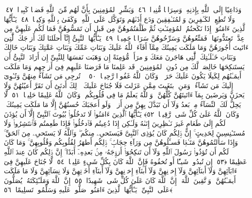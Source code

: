  وَدَاعِيًا إِلَى ٱللَّهِ بِإِذنِهِۦ وَسِرَاجًۭا مُّنِيرًۭا ﴿٤٦﴾
 وَبَشِّرِ ٱلمُؤمِنِينَ بِأَنَّ لَهُم مِّنَ ٱللَّهِ فَضلًۭا كَبِيرًۭا ﴿٤٧﴾
 وَلَا تُطِعِ ٱلكَـٰفِرِينَ وَٱلمُنَـٰفِقِينَ وَدَع أَذَىٰهُم وَتَوَكَّل عَلَى ٱللَّهِ ۚ وَكَفَىٰ بِٱللَّهِ وَكِيلًۭا ﴿٤٨﴾
 يَـٰٓأَيُّهَا ٱلَّذِينَ ءَامَنُوٓا۟ إِذَا نَكَحتُمُ ٱلمُؤمِنَـٰتِ ثُمَّ طَلَّقتُمُوهُنَّ مِن قَبلِ أَن تَمَسُّوهُنَّ فَمَا لَكُم عَلَيهِنَّ مِن عِدَّةٍۢ تَعتَدُّونَهَا ۖ فَمَتِّعُوهُنَّ وَسَرِّحُوهُنَّ سَرَاحًۭا جَمِيلًۭا ﴿٤٩﴾
 يَـٰٓأَيُّهَا ٱلنَّبِىُّ إِنَّآ أَحلَلنَا لَكَ أَزوَٟجَكَ ٱلَّٰتِىٓ ءَاتَيتَ أُجُورَهُنَّ وَمَا مَلَكَت يَمِينُكَ مِمَّآ أَفَآءَ ٱللَّهُ عَلَيكَ وَبَنَاتِ عَمِّكَ وَبَنَاتِ عَمَّٰتِكَ وَبَنَاتِ خَالِكَ وَبَنَاتِ خَـٰلَـٰتِكَ ٱلَّٰتِى هَاجَرنَ مَعَكَ وَٱمرَأَةًۭ مُّؤمِنَةً إِن وَهَبَت نَفسَهَا لِلنَّبِىِّ إِن أَرَادَ ٱلنَّبِىُّ أَن يَستَنكِحَهَا خَالِصَةًۭ لَّكَ مِن دُونِ ٱلمُؤمِنِينَ ۗ قَد عَلِمنَا مَا فَرَضنَا عَلَيهِم فِىٓ أَزوَٟجِهِم وَمَا مَلَكَت أَيمَـٰنُهُم لِكَيلَا يَكُونَ عَلَيكَ حَرَجٌۭ ۗ وَكَانَ ٱللَّهُ غَفُورًۭا رَّحِيمًۭا ﴿٥٠﴾
 ۞ تُرجِى مَن تَشَآءُ مِنهُنَّ وَتُـٔوِىٓ إِلَيكَ مَن تَشَآءُ ۖ وَمَنِ ٱبتَغَيتَ مِمَّن عَزَلتَ فَلَا جُنَاحَ عَلَيكَ ۚ ذَٟلِكَ أَدنَىٰٓ أَن تَقَرَّ أَعيُنُهُنَّ وَلَا يَحزَنَّ وَيَرضَينَ بِمَآ ءَاتَيتَهُنَّ كُلُّهُنَّ ۚ وَٱللَّهُ يَعلَمُ مَا فِى قُلُوبِكُم ۚ وَكَانَ ٱللَّهُ عَلِيمًا حَلِيمًۭا ﴿٥١﴾
 لَّا يَحِلُّ لَكَ ٱلنِّسَآءُ مِنۢ بَعدُ وَلَآ أَن تَبَدَّلَ بِهِنَّ مِن أَزوَٟجٍۢ وَلَو أَعجَبَكَ حُسنُهُنَّ إِلَّا مَا مَلَكَت يَمِينُكَ ۗ وَكَانَ ٱللَّهُ عَلَىٰ كُلِّ شَىءٍۢ رَّقِيبًۭا ﴿٥٢﴾
 يَـٰٓأَيُّهَا ٱلَّذِينَ ءَامَنُوا۟ لَا تَدخُلُوا۟ بُيُوتَ ٱلنَّبِىِّ إِلَّآ أَن يُؤذَنَ لَكُم إِلَىٰ طَعَامٍ غَيرَ نَـٰظِرِينَ إِنَىٰهُ وَلَـٰكِن إِذَا دُعِيتُم فَٱدخُلُوا۟ فَإِذَا طَعِمتُم فَٱنتَشِرُوا۟ وَلَا مُستَـٔنِسِينَ لِحَدِيثٍ ۚ إِنَّ ذَٟلِكُم كَانَ يُؤذِى ٱلنَّبِىَّ فَيَستَحىِۦ مِنكُم ۖ وَٱللَّهُ لَا يَستَحىِۦ مِنَ ٱلحَقِّ ۚ وَإِذَا سَأَلتُمُوهُنَّ مَتَـٰعًۭا فَسـَٔلُوهُنَّ مِن وَرَآءِ حِجَابٍۢ ۚ ذَٟلِكُم أَطهَرُ لِقُلُوبِكُم وَقُلُوبِهِنَّ ۚ وَمَا كَانَ لَكُم أَن تُؤذُوا۟ رَسُولَ ٱللَّهِ وَلَآ أَن تَنكِحُوٓا۟ أَزوَٟجَهُۥ مِنۢ بَعدِهِۦٓ أَبَدًا ۚ إِنَّ ذَٟلِكُم كَانَ عِندَ ٱللَّهِ عَظِيمًا ﴿٥٣﴾
 إِن تُبدُوا۟ شَيـًٔا أَو تُخفُوهُ فَإِنَّ ٱللَّهَ كَانَ بِكُلِّ شَىءٍ عَلِيمًۭا ﴿٥٤﴾
 لَّا جُنَاحَ عَلَيهِنَّ فِىٓ ءَابَآئِهِنَّ وَلَآ أَبنَآئِهِنَّ وَلَآ إِخوَٟنِهِنَّ وَلَآ أَبنَآءِ إِخوَٟنِهِنَّ وَلَآ أَبنَآءِ أَخَوَٟتِهِنَّ وَلَا نِسَآئِهِنَّ وَلَا مَا مَلَكَت أَيمَـٰنُهُنَّ ۗ وَٱتَّقِينَ ٱللَّهَ ۚ إِنَّ ٱللَّهَ كَانَ عَلَىٰ كُلِّ شَىءٍۢ شَهِيدًا ﴿٥٥﴾
 إِنَّ ٱللَّهَ وَمَلَـٰٓئِكَتَهُۥ يُصَلُّونَ عَلَى ٱلنَّبِىِّ ۚ يَـٰٓأَيُّهَا ٱلَّذِينَ ءَامَنُوا۟ صَلُّوا۟ عَلَيهِ وَسَلِّمُوا۟ تَسلِيمًا ﴿٥٦﴾
